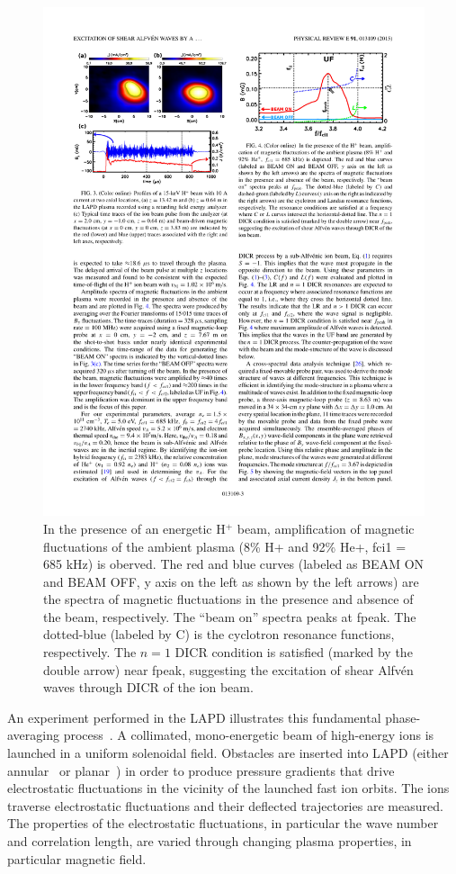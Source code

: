 \documentclass[11pt]{article}
\renewcommand{\cite}{\citep}
\begin{document}
\begin{figure}
\begin{center}
\includegraphics[width=3.2truein]{intense_ion}
\caption{In the presence of an energetic H$^+$ beam, amplification of
  magnetic fluctuations of the ambient plasma (8\% H+ and 92\% He+,
  fci1 = 685 kHz) is oberved. The red and blue curves (labeled as
  BEAM ON and BEAM OFF, y axis on the left as shown by the left
  arrows) are the spectra of magnetic fluctuations in the presence and
  absence of the beam, respectively. The “beam on” spectra peaks at
  fpeak. The dotted-blue (labeled by C) is the
   cyclotron resonance functions, respectively. The $n = 1$ DICR
  condition is satisfied (marked by the double arrow) near fpeak,
  suggesting the excitation of shear Alfv\'{e}n waves through DICR of the
  ion beam.}\label{intense_ion}
\end{center}
\end{figure}
An experiment performed in the
LAPD illustrates this fundamental
phase-averaging process~\cite{zhou:2010,zhou:2012a, zhou:2012b, heidbrink:2012}. A collimated, mono-energetic beam
of high-energy ions is launched in a uniform solenoidal field.
Obstacles are inserted into LAPD (either annular~\cite{zhou:2012a} or
planar~\cite{carter:2006}) in order to produce pressure gradients that drive
electrostatic fluctuations in the vicinity of the launched fast ion
orbits.  The ions traverse electrostatic fluctuations and their
deflected trajectories are measured.  The properties of the
electrostatic fluctuations, in particular the wave number and
correlation length, are varied through changing plasma properties, in
particular magnetic field.  
\end{document}
